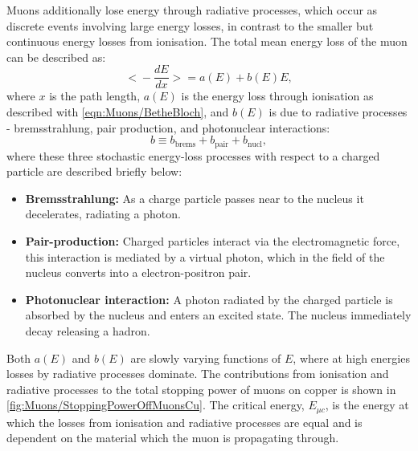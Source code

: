 Muons additionally lose energy through radiative processes, which occur as discrete events involving large energy losses, in contrast to the smaller but continuous energy losses from ionisation. The total mean energy loss of the muon can be described as:
\begin{equation}\label{eqn:Muons/totMeanEnergyLossMu}
    \Biggl<-\frac{dE}{dx}\Biggl>=a(E)+b(E)E,
\end{equation}
where $x$ is the path length, $a(E)$ is the energy loss through ionisation as described with \autoref{eqn:Muons/BetheBloch}, and $b(E)$ is due to radiative
processes - bremsstrahlung, pair production, and photonuclear interactions:
\begin{equation}\label{eqn:Muons/radproc}
    b\equiv b_{\text{brems}}+b_{\text{pair}}+b_{\text{nucl}},
\end{equation}
where these three stochastic energy-loss processes with respect to a charged particle are described briefly below:
\begin{itemize}
    \item \textbf{Bremsstrahlung:} As a charge particle passes near to the nucleus it decelerates, radiating a photon.
    \item \textbf{Pair-production:} Charged particles interact via the electromagnetic force, this interaction is mediated by a virtual photon, which in the field of the nucleus converts into a electron-positron pair.
    \item \textbf{Photonuclear interaction:} A photon radiated by the charged particle is absorbed by the nucleus and enters an excited state. The nucleus immediately decay releasing a hadron.
\end{itemize}
Both $a(E)$ and $b(E)$ are slowly varying functions of $E$, where at high energies losses by radiative processes dominate. The contributions from ionisation and radiative processes to the total stopping power of muons on copper is shown in \autoref{fig:Muons/StoppingPowerOffMuonsCu}. The critical energy, $E_{\mu c}$, is the energy at which the losses from ionisation and radiative processes are equal and is dependent on the material which the muon is propagating through.
